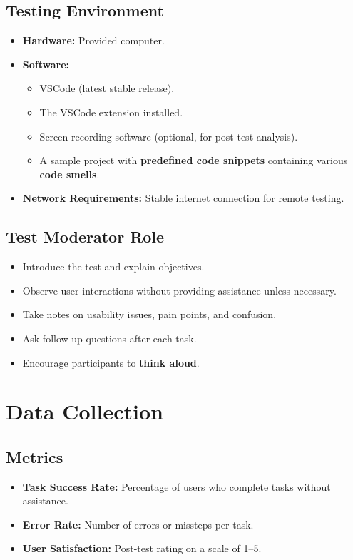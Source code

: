 \documentclass[12pt, titlepage]{article}
\begin{document}
\subsection*{Testing Environment}
\begin{itemize}
  \item \textbf{Hardware:} Provided computer.
  \item \textbf{Software:}
    \begin{itemize}
      \item VSCode (latest stable release).
      \item The VSCode extension installed.
      \item Screen recording software (optional, for post-test analysis).
      \item A sample project with \textbf{predefined code snippets}
        containing various \textbf{code smells}.
    \end{itemize}
  \item \textbf{Network Requirements:} Stable internet connection for
    remote testing.
\end{itemize}

\subsection*{Test Moderator Role}
\begin{itemize}
  \item Introduce the test and explain objectives.
  \item Observe user interactions without providing assistance unless necessary.
  \item Take notes on usability issues, pain points, and confusion.
  \item Ask follow-up questions after each task.
  \item Encourage participants to \textbf{think aloud}.
\end{itemize}

\section*{Data Collection}
\subsection*{Metrics}
\begin{itemize}
  \item \textbf{Task Success Rate:} Percentage of users who complete
    tasks without assistance.
  \item \textbf{Error Rate:} Number of errors or missteps per task.
  \item \textbf{User Satisfaction:} Post-test rating on a scale of 1–5.
\end{itemize}
\end{document}
